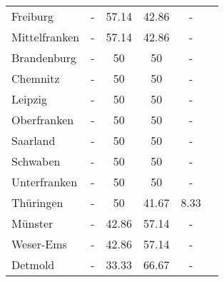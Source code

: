 \begin{table}[H]
\begin{tabularx}{\textwidth}{Xccccc}
            Freiburg & - & 57.14 & 42.86 & - \\
            Mittelfranken & - & 57.14 & 42.86 & - \\
            Brandenburg & - & 50 & 50 & - \\
            Chemnitz & - & 50 & 50 & - \\
            Leipzig & - & 50 & 50 & - \\
            Oberfranken & - & 50 & 50 & - \\
            Saarland & - & 50 & 50 & - \\
            Schwaben & - & 50 & 50 & - \\
            Unterfranken & - & 50 & 50 & - \\
            Thüringen & - & 50 & 41.67 & 8.33 \\
            Münster & - & 42.86 & 57.14 & - \\
            Weser-Ems & - & 42.86 & 57.14 & - \\
            Detmold & - & 33.33 & 66.67 & - \\
        \bottomrule
    \end{tabularx}
\end{table}
    